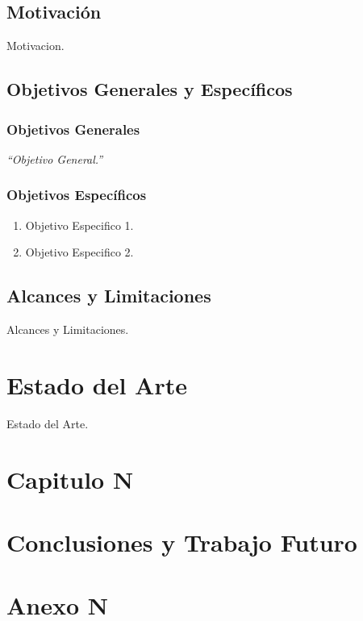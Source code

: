 \documentclass[a4paper,12pt,openany,oneside]{book}
\begin{document}
\section{Motivación}

Motivacion.

\newpage

\section{Objetivos Generales y Específicos}

\subsection{Objetivos Generales}

\textit{``Objetivo General.''}

\subsection{Objetivos Específicos}

\begin{enumerate}
 \item Objetivo Especifico 1.
 \item Objetivo Especifico 2.
\end{enumerate}

\section{Alcances y Limitaciones}

Alcances y Limitaciones.

\chapter{Estado del Arte}

Estado del Arte.

\chapter{Capitulo N}

\chapter{Conclusiones y Trabajo Futuro}


%

\appendix
\renewcommand{\appendixname}{Anexo}

\chapter{Anexo N}
\end{document}
